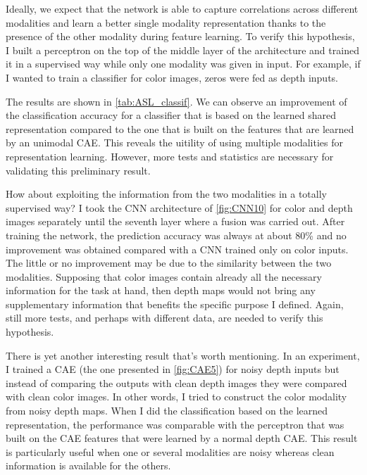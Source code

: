 Ideally, we expect that the network is able to capture correlations
across different modalities and learn a better single modality
representation thanks to the presence of the other modality
during feature learning. To verify this hypothesis, I built a perceptron
on the top of the middle layer of the architecture and trained it
in a supervised way while only one modality was given in input. For example,
if I wanted to train a classifier for color images, zeros were fed as
depth inputs.

The results are shown in \autoref{tab:ASL_classif}.
We can observe an improvement of the classification accuracy for a
classifier that is based on the learned shared representation 
compared to the one that is built on the features that are learned by
an unimodal CAE. This reveals the uitility of using multiple modalities
for representation learning. However, more tests and statistics
are necessary for validating this preliminary result.

How about exploiting the information from the two modalities in a
totally supervised way? I took the CNN architecture of \autoref{fig:CNN10}
for color and depth images separately until the seventh layer where
a fusion was carried out. After training the network, the prediction
accuracy was always at about 80\% and no improvement was obtained compared
with a CNN trained only on color inputs. The little or no improvement
may be due to the similarity between the two modalities. Supposing that
color images contain already all the necessary information for the task
at hand, then depth maps would not bring any supplementary information
that benefits the specific purpose I defined. Again, still more tests,
and perhaps with different data, are needed to verify this hypothesis.

There is yet another interesting result that's worth mentioning.
In an experiment, I trained a CAE (the one presented in
\autoref{fig:CAE5}) for noisy depth inputs but instead of comparing
the outputs with clean depth images they were compared with clean
color images. In other words, I tried to construct the color modality from
noisy depth maps. When I did the classification based on the learned
representation, the performance was comparable with the perceptron
that was built on the CAE features that were learned by a normal
depth CAE. This result is particularly useful when one or several
modalities are noisy whereas clean information is available for the others.

